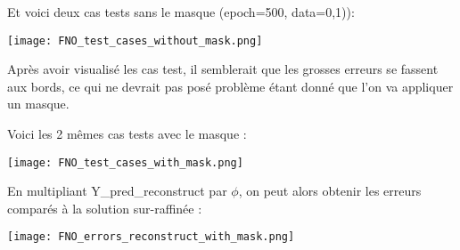 \newpage

Et voici deux cas tests sans le masque (epoch=500, data=0,1)):

\begin{minipage}{\linewidth}
	\centering
	\texttt{[image: FNO\_test\_cases\_without\_mask.png]}
\end{minipage}

Après avoir visualisé les cas test, il semblerait que les grosses erreurs se fassent aux bords, ce qui ne devrait pas posé problème étant donné que l'on va appliquer un masque.

Voici les 2 mêmes cas tests avec le masque :

\begin{minipage}{\linewidth}
	\centering
	\texttt{[image: FNO\_test\_cases\_with\_mask.png]}
\end{minipage}

En multipliant Y\_pred\_reconstruct par $\phi$, on peut alors obtenir les erreurs comparés à la solution sur-raffinée :

\begin{minipage}{\linewidth}
	\centering
	\texttt{[image: FNO\_errors\_reconstruct\_with\_mask.png]}
\end{minipage}

